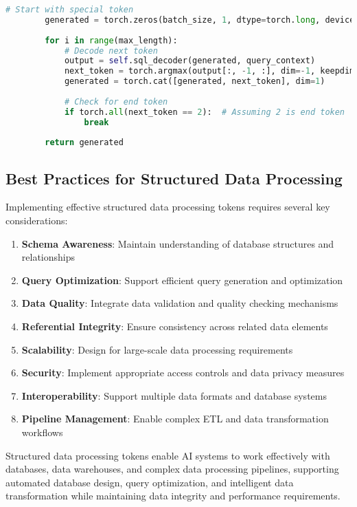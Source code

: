 \begin{lstlisting}[language=Python, caption=Natural language to SQL generation system]
        # Start with special token
        generated = torch.zeros(batch_size, 1, dtype=torch.long, device=device)
        
        for i in range(max_length):
            # Decode next token
            output = self.sql_decoder(generated, query_context)
            next_token = torch.argmax(output[:, -1, :], dim=-1, keepdim=True)
            generated = torch.cat([generated, next_token], dim=1)
            
            # Check for end token
            if torch.all(next_token == 2):  # Assuming 2 is end token
                break
        
        return generated
\end{lstlisting}

\subsection{Best Practices for Structured Data Processing}

Implementing effective structured data processing tokens requires several key considerations:

\begin{enumerate}
\item \textbf{Schema Awareness}: Maintain understanding of database structures and relationships
\item \textbf{Query Optimization}: Support efficient query generation and optimization
\item \textbf{Data Quality}: Integrate data validation and quality checking mechanisms
\item \textbf{Referential Integrity}: Ensure consistency across related data elements
\item \textbf{Scalability}: Design for large-scale data processing requirements
\item \textbf{Security}: Implement appropriate access controls and data privacy measures
\item \textbf{Interoperability}: Support multiple data formats and database systems
\item \textbf{Pipeline Management}: Enable complex ETL and data transformation workflows
\end{enumerate}

Structured data processing tokens enable AI systems to work effectively with databases, data warehouses, and complex data processing pipelines, supporting automated database design, query optimization, and intelligent data transformation while maintaining data integrity and performance requirements.